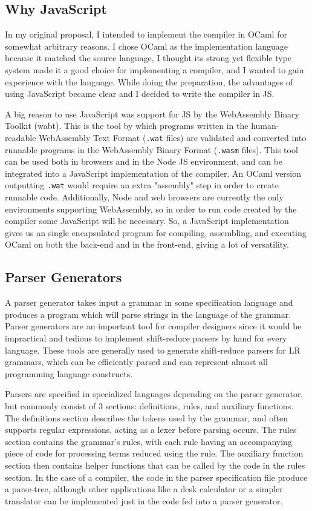\documentclass[12pt,a4paper,twoside,openright]{report}
\begin{document}
\subsection{Why JavaScript}
In my original proposal, I intended to implement the compiler in OCaml for somewhat arbitrary reasons.
I chose OCaml as the implementation language because it matched the source language, I thought its strong yet flexible type system made it a good choice for implementing a compiler, and I wanted to gain experience with the language.
While doing the preparation, the advantages of using JavaScript became clear and I decided to write the compiler in JS.

A big reason to use JavaScript was support for JS by the WebAssembly Binary Toolkit (wabt).
This is the tool by which programs written in the human-readable WebAssembly Text Format ({\tt .wat} files) are validated and converted into runnable programs in the WebAssembly Binary Format ({\tt .wasm} files).
This tool can be used both in browsers and in the Node JS environment, and can be integrated into a JavaScript implementation of the compiler.
An OCaml version outputting {\tt .wat} would require an extra "assembly" step in order to create runnable code.
Additionally, Node and web browsers are currently the only environments supporting WebAssembly, so in order to run code created by the compiler some JavaScript will be necessary.
So, a JavaScript implementation gives us an single encapsulated program for compiling, assembling, and executing OCaml on both the back-end and in the front-end, giving a lot of versatility.

\subsection{Parser Generators}
A parser generator takes input a grammar in some specification language and produces a program which will parse strings in the language of the grammar.
Parser generators are an important tool for compiler designers since it would be impractical and tedious to implement shift-reduce parsers by hand for every language.
These tools are generally used to generate shift-reduce parsers for LR grammars, which can be efficiently parsed and can represent almost all programming language constructs.

Parsers are specified in specialized languages depending on the parser generator, but commonly consist of 3 sections: definitions, rules, and auxiliary functions.
The definitions section describes the tokens used by the grammar, and often supports regular expressions, acting as a lexer before parsing occurs.
The rules section contains the grammar's rules, with each rule having an accompanying piece of code for processing terms reduced using the rule.
The auxiliary function section then contains helper functions that can be called by the code in the rules section.
In the case of a compiler, the code in the parser specification file produce a parse-tree, although other applications like a desk calculator or a simpler translator can be implemented just in the code fed into a parser generator.
\end{document}
